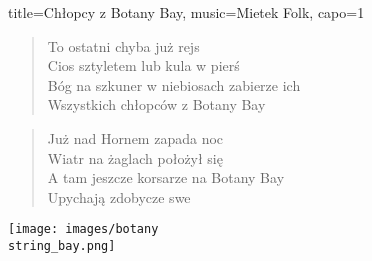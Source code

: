 \begin{song}{title={Chłopcy z Botany Bay}, music={Mietek Folk}, capo=1}
\begin{multicols}{2}
\begin{verse}
    \end{verse}
    \begin{verse}
        To ostatni chyba już rejs \\
        Cios sztyletem lub kula w pierś \\
        Bóg na szkuner w niebiosach zabierze ich \\
        Wszystkich chłopców z Botany Bay
    \end{verse}
    \begin{verse}
        Już nad Hornem zapada noc \\
        Wiatr na żaglach położył się \\
        A tam jeszcze korsarze na Botany Bay \\
        Upychają zdobycze swe
    \end{verse}
\end{multicols}
\begin{center}
    \texttt{[image: images/botany\\string\_bay.png]}
\end{center}
\end{song}

